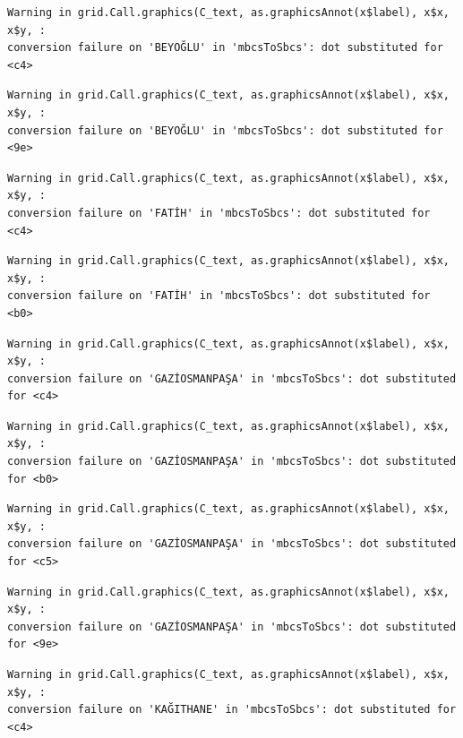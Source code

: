 \documentclass[
  11pt,
  a4paper,
  DIV=11,
  numbers=noendperiod]{scrartcl}
\begin{document}
\begin{verbatim}
Warning in grid.Call.graphics(C_text, as.graphicsAnnot(x$label), x$x, x$y, :
conversion failure on 'BEYOĞLU' in 'mbcsToSbcs': dot substituted for <c4>
\end{verbatim}

\begin{verbatim}
Warning in grid.Call.graphics(C_text, as.graphicsAnnot(x$label), x$x, x$y, :
conversion failure on 'BEYOĞLU' in 'mbcsToSbcs': dot substituted for <9e>
\end{verbatim}

\begin{verbatim}
Warning in grid.Call.graphics(C_text, as.graphicsAnnot(x$label), x$x, x$y, :
conversion failure on 'FATİH' in 'mbcsToSbcs': dot substituted for <c4>
\end{verbatim}

\begin{verbatim}
Warning in grid.Call.graphics(C_text, as.graphicsAnnot(x$label), x$x, x$y, :
conversion failure on 'FATİH' in 'mbcsToSbcs': dot substituted for <b0>
\end{verbatim}

\begin{verbatim}
Warning in grid.Call.graphics(C_text, as.graphicsAnnot(x$label), x$x, x$y, :
conversion failure on 'GAZİOSMANPAŞA' in 'mbcsToSbcs': dot substituted for <c4>
\end{verbatim}

\begin{verbatim}
Warning in grid.Call.graphics(C_text, as.graphicsAnnot(x$label), x$x, x$y, :
conversion failure on 'GAZİOSMANPAŞA' in 'mbcsToSbcs': dot substituted for <b0>
\end{verbatim}

\begin{verbatim}
Warning in grid.Call.graphics(C_text, as.graphicsAnnot(x$label), x$x, x$y, :
conversion failure on 'GAZİOSMANPAŞA' in 'mbcsToSbcs': dot substituted for <c5>
\end{verbatim}

\begin{verbatim}
Warning in grid.Call.graphics(C_text, as.graphicsAnnot(x$label), x$x, x$y, :
conversion failure on 'GAZİOSMANPAŞA' in 'mbcsToSbcs': dot substituted for <9e>
\end{verbatim}

\begin{verbatim}
Warning in grid.Call.graphics(C_text, as.graphicsAnnot(x$label), x$x, x$y, :
conversion failure on 'KAĞITHANE' in 'mbcsToSbcs': dot substituted for <c4>
\end{verbatim}
\end{document}
